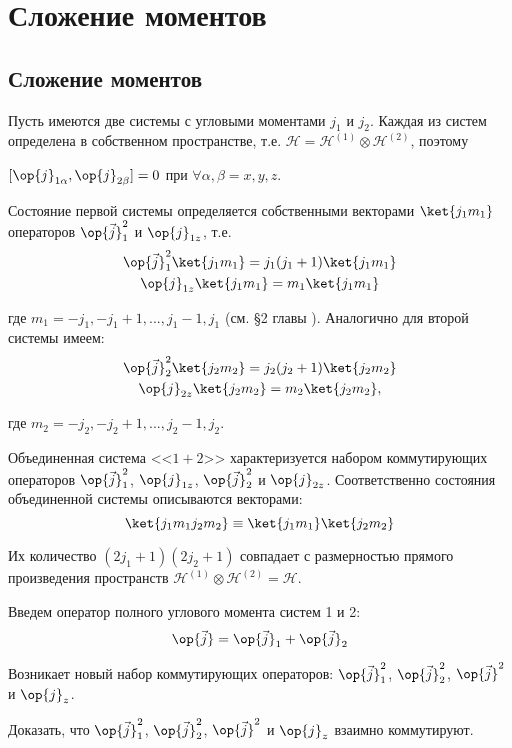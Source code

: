 \chapter{Сложение моментов}

\section{Сложение моментов}

Пусть имеются две системы с угловыми моментами $j_1$ и $j_2$. Каждая из систем определена в собственном пространстве, т.е. $\mathcal{H} = \mathcal{H}^{(1)} \otimes \mathcal{H}^{(2)}$, поэтому

$[\op{j}_{1 \alpha}, \op{j}_{2 \beta}] = 0$ при $\forall \alpha, \beta = x, y, z$.

Состояние первой системы определяется собственными векторами $\ket{j_1 m_1}$ операторов $\op{\vec{j}}_1^2$ и $\op{j}_{1z}$, т.е.
\begin{gather*}
\op{\vec{j}}_1^2\ket{j_1 m_1} = j_1(j_1 + 1)\ket{j_1 m_1}  \\
\op{j}_{1z} \ket{j_1 m_1} = m_1\ket{j_1 m_1} 
\end{gather*}

где $m_1 = -j_1, -j_1 + 1, ... , j_1 - 1, j_1$ (см. \S 2 главы ). Аналогично для второй системы имеем:
\begin{gather*}
\op{\vec{j}}_2^2\ket{j_2 m_2} = j_2(j_2 + 1)\ket{j_2 m_2}  \\
\op{j}_{2z} \ket{j_2 m_2} = m_2\ket{j_2 m_2}, 
\end{gather*}

где $m_2 = -j_2, -j_2 + 1, ... , j_2 - 1, j_2$.

Объединенная система <<$1 + 2$>> характеризуется набором коммутирующих операторов $\op{\vec{j}}_1^2$, $\op{j}_{1z}$, $\op{\vec{j}}_2^2$ и $\op{j}_{2z}$. Соответственно состояния объединенной системы описываются векторами:
$$
\ket{j_1 m_1 j_2 m_2} \equiv \ket{j_1 m_1} \ket{j_2 m_2} 
$$

Их количество $(2j_1 + 1)(2j_2 + 1)$ совпадает с размерностью прямого произведения пространств $\mathcal{H}^{(1)} \otimes \mathcal{H}^{(2)} = \mathcal{H}$.

Введем оператор полного углового момента систем 1 и 2:
$$
\op{\vec{j}} = \op{\vec{j}}_1 + \op{\vec{j}}_2
$$

Возникает новый набор коммутирующих операторов: $\op{\vec{j}}_1^2$, $\op{\vec{j}}_2^2$, $\op{\vec{j}}^2$ и $\op{j}_{z}$.
\begin{excr}
Доказать, что $\op{\vec{j}}_1^2$, $\op{\vec{j}}_2^2$, $\op{\vec{j}}^2$ и $\op{j}_{z}$ взаимно коммутируют.
\end{excr}

